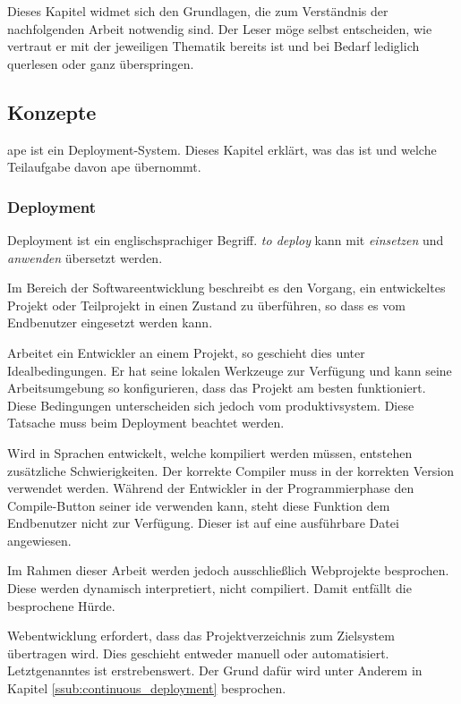 Dieses Kapitel widmet sich den Grundlagen, die zum Verständnis der nachfolgenden Arbeit notwendig sind. Der Leser möge selbst entscheiden, wie vertraut er mit der jeweiligen Thematik bereits ist und bei Bedarf lediglich querlesen oder ganz überspringen.

\subsection{Konzepte} %
\label{sub:konzepte}

\gls{ape} ist ein Deployment-System. Dieses Kapitel erklärt, was das ist und welche Teilaufgabe davon \gls{ape} übernommt.

\subsubsection{Deployment} %
\label{ssub:deployment}

Deployment ist ein englischsprachiger Begriff. \emph{to deploy} kann mit \emph{einsetzen} und \emph{anwenden} übersetzt werden.

Im Bereich der Softwareentwicklung beschreibt es den Vorgang, ein entwickeltes Projekt oder Teilprojekt in einen Zustand zu überführen, so dass es vom Endbenutzer eingesetzt werden kann.

Arbeitet ein Entwickler an einem Projekt, so geschieht dies unter Idealbedingungen. Er hat seine lokalen Werkzeuge zur Verfügung und kann seine Arbeitsumgebung so konfigurieren, dass das Projekt am besten funktioniert. Diese Bedingungen unterscheiden sich jedoch vom \gls{produktivsystem}. Diese Tatsache muss beim Deployment beachtet werden.

Wird in Sprachen entwickelt, welche kompiliert werden müssen, entstehen zusätzliche Schwierigkeiten. Der korrekte Compiler muss in der korrekten Version verwendet werden. Während der Entwickler in der Programmierphase den Compile-Button seiner \gls{ide} verwenden kann, steht diese Funktion dem Endbenutzer nicht zur Verfügung. Dieser ist auf eine ausführbare Datei angewiesen.

Im Rahmen dieser Arbeit werden jedoch ausschließlich Webprojekte besprochen. Diese werden dynamisch interpretiert, nicht compiliert. Damit entfällt die besprochene Hürde.

Webentwicklung erfordert, dass das Projektverzeichnis zum Zielsystem übertragen wird. Dies geschieht entweder manuell oder automatisiert. Letztgenanntes ist erstrebenswert. Der Grund dafür wird unter Anderem in Kapitel \ref{ssub:continuous_deployment} besprochen.

